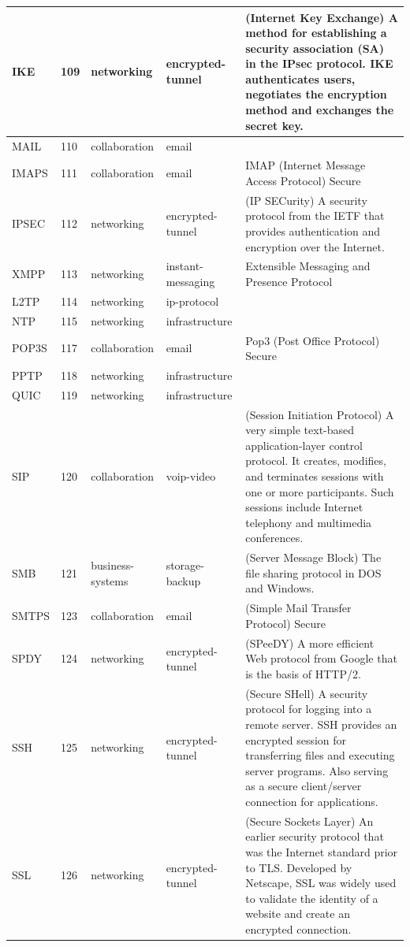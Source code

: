 \begin{longtable}{p{}|p{}|p{}|p{}|p{}}
    IKE &	109 &	networking &	encrypted-tunnel &	(Internet Key Exchange) A method for establishing a security association (SA) in the IPsec protocol. IKE authenticates users, negotiates the encryption method and exchanges the secret key. \\ \hline
    MAIL &	110 &	collaboration &	email & \\ \hline	
    IMAPS &	111 &	collaboration &	email &	IMAP (Internet Message Access Protocol) Secure \\ \hline	
    IPSEC &	112 &	networking &	encrypted-tunnel &	(IP SECurity) A security protocol from the IETF that provides authentication and encryption over the Internet.\\ \hline	
    XMPP &	113 &	networking &	instant-messaging &	Extensible Messaging and Presence Protocol\\ \hline	
    L2TP &	114 &	networking &	ip-protocol	& \\ \hline	
    NTP &	115 &	networking &	infrastructure &	\\ \hline	
    POP3S &	117 &	collaboration &	email &	Pop3 (Post Office Protocol) Secure\\ \hline	
    PPTP &	118 &	networking &	infrastructure &	\\ \hline	
    QUIC &	119 &	networking &	infrastructure &	\\ \hline	
    SIP &	120 &	collaboration &	voip-video &	(Session Initiation Protocol) A very simple text-based application-layer control protocol. It creates, modifies, and terminates sessions with one or more participants. Such sessions include Internet telephony and multimedia conferences.\\ \hline	
    SMB &	121 &	business-systems &	storage-backup &	(Server Message Block) The file sharing protocol in DOS and Windows.\\ \hline	
    SMTPS &	123 &	collaboration &	email &	 (Simple Mail Transfer Protocol) Secure\\ \hline	
    SPDY &	124 &	networking &	encrypted-tunnel &	(SPeeDY) A more efficient Web protocol from Google that is the basis of HTTP/2. \\ \hline	
    SSH &	125 &	networking &	encrypted-tunnel &	(Secure SHell) A security protocol for logging into a remote server. SSH provides an encrypted session for transferring files and executing server programs. Also serving as a secure client/server connection for applications.\\ \hline
    SSL &	126 &	networking &	encrypted-tunnel &	(Secure Sockets Layer) An earlier security protocol that was the Internet standard prior to TLS. Developed by Netscape, SSL was widely used to validate the identity of a website and create an encrypted connection. \\ \hline

\end{longtable}
